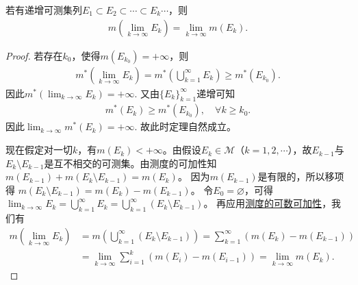 \documentclass[../../main.tex]{subfiles}%
\begin{document}
\begin{theorem}[递增可测集列的测度运算]\label{theorem:递增可测集列的测度运算}
若有递增可测集列$E_1\subset E_2\subset\cdots\subset E_k\cdots$，则
\begin{align}
m\left(\lim_{k\to\infty}E_k\right)=\lim_{k\to\infty}m(E_k).\label{eq:2.4}
\end{align}
\end{theorem}
\begin{proof}

若存在$k_0$，使得$m(E_{k_0})=+\infty$，则
\begin{align*}
m^*\left(\lim_{k\rightarrow \infty}E_k\right) = m^*\left(\bigcup_{k=1}^{\infty}E_k\right)\geqslant m^*(E_{k_0}).
\end{align*}
因此$m^*\left(\lim_{k\rightarrow \infty}E_k\right) = +\infty$. 又由$\{E_k\}_{k=1}^{\infty}$递增可知
\begin{align*}
m^*(E_k) \geqslant m^*(E_{k_0}), \quad \forall k \geqslant k_0.
\end{align*}
因此$\lim_{k\rightarrow \infty}m^*(E_k) = +\infty$.
故此时定理自然成立。

现在假定对一切$k$，有$m(E_k)<+\infty$。由假设$E_k\in\mathscr{M}$（$k = 1,2,\cdots$），故$E_{k - 1}$与$E_k\setminus E_{k - 1}$是互不相交的可测集。由测度的可加性知
$m(E_{k - 1})+m(E_k\setminus E_{k - 1})=m(E_k)$。
因为$m(E_{k - 1})$是有限的，所以移项得
$m(E_k\setminus E_{k - 1})=m(E_k)-m(E_{k - 1})$。
令$E_0 = \varnothing$，可得
$\lim_{k\to\infty}E_k=\bigcup_{k = 1}^{\infty}E_k=\bigcup_{k = 1}^{\infty}(E_k\setminus E_{k - 1})$。
再应用\hyperref[theorem:测度的基本性质]{测度的可数可加性}，我们有
\begin{align*}
m\left(\lim_{k\to\infty}E_k\right)&=m\left(\bigcup_{k = 1}^{\infty}(E_k\setminus E_{k - 1})\right)
=\sum_{k = 1}^{\infty}(m(E_k)-m(E_{k - 1}))\\
&=\lim_{k\to\infty}\sum_{i = 1}^{k}(m(E_i)-m(E_{i - 1}))
=\lim_{k\to\infty}m(E_k).
\end{align*}

\end{proof}
\end{document}
